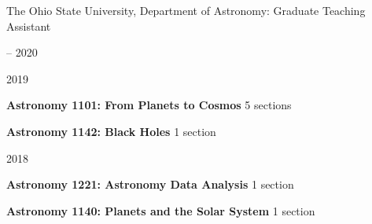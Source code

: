 \documentclass[cv.tex]{subfiles}
\begin{document}
\vspace{4mm}
\noindent
{\color{themecolor} \large The Ohio State University, Department of Astronomy:
Graduate Teaching Assistant}
\par\noindent
\parbox{0.18\textwidth}{%
	 -- 2020 \par
	2019 \par
}
\hspace{1mm}
\parbox{0.8\textwidth}{%
	\vspace{1mm}
	\textbf{Astronomy 1101: From Planets to Cosmos} \hfill 5 sections \par
	\textbf{Astronomy 1142: Black Holes} \hfill 1 section \par
}

\par\noindent
\parbox{0.18\textwidth}{%
	 \par
	2018
}
\hspace{1mm}
\parbox{0.8\textwidth}{
	\textbf{Astronomy 1221: Astronomy Data Analysis} \hfill 1 section \par
	\textbf{Astronomy 1140: Planets and the Solar System} \hfill 1 section \par
}
\end{document}

